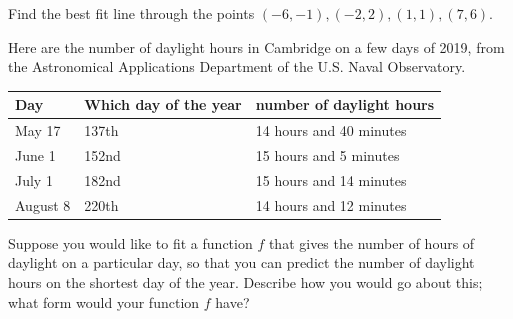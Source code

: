 \begin{enumerate}
\vfill

\newpage

\Problem Find the best fit line through the points $(-6,-1), (-2,2), (1,1), (7,6).$

\vfill

\Problem   Here are the number of daylight hours in Cambridge on a few days of
  2019, from the Astronomical Applications Department of the
  U.S. Naval Observatory.

  \begin{center}
    \begin{tabular}{l l l}
      Day & Which day of the year & number of daylight hours \\
      \hline
      May 17 & 137th & 14 hours and 40 minutes \\
      June 1 & 152nd & 15 hours and 5 minutes \\
      July 1 & 182nd & 15 hours and 14 minutes \\
      August 8 & 220th & 14 hours and 12 minutes
    \end{tabular}
  \end{center}

  Suppose you would like to fit a function $f$ that gives the
  number of hours of daylight on a particular day, so that you can
  predict the number of daylight hours on the shortest day of the
  year.  Describe how you would go about this; what form would your
  function $f$ have? 
  
  \vfill

\newpage

\end{enumerate}

